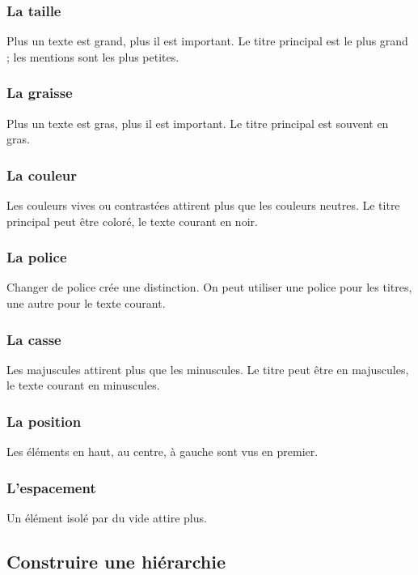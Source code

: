 \subsubsection{La taille}

Plus un texte est grand, plus il est important. Le titre principal est le plus grand ; les mentions sont les plus petites.

\subsubsection{La graisse}

Plus un texte est gras, plus il est important. Le titre principal est souvent en gras.

\subsubsection{La couleur}

Les couleurs vives ou contrastées attirent plus que les couleurs neutres. Le titre principal peut être coloré, le texte courant en noir.

\subsubsection{La police}

Changer de police crée une distinction. On peut utiliser une police pour les titres, une autre pour le texte courant.

\subsubsection{La casse}

Les majuscules attirent plus que les minuscules. Le titre peut être en majuscules, le texte courant en minuscules.

\subsubsection{La position}

Les éléments en haut, au centre, à gauche sont vus en premier.

\subsubsection{L'espacement}

Un élément isolé par du vide attire plus.

\subsection{Construire une hiérarchie}

